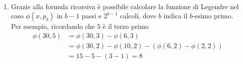 \begin{esempio}\
	\begin{enumerate}
		\item Grazie alla formula ricorsiva è possibile calcolare la funzione di Legendre
		nel caso $\phi(x,p_b)$ in $b-1$ passi e $2^{b-1}$ calcoli, dove $b$ indica il $b$-esimo 
		primo. 
		Per esempio, ricordando che $5$ è il terzo primo 
		\begin{align*}
			\phi(30, 5) & = \phi(30, 3) - \phi(6,3) \\
						& = \phi(30, 2) - \phi(10, 2) - (\phi(6,2) - \phi(2,2)) \\
						& = 15 - 5 - (3 - 1) = 8
		\end{align*}
	\end{enumerate}
\end{esempio}
